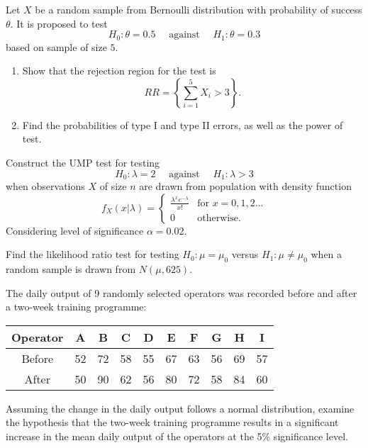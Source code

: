 \begin{mdframed}
    \begin{Exercise}
        Let $X$ be a random sample from Bernoulli distribution 
        with probability of success $\theta$. It is proposed to test
        \[
            H_0 : \theta = 0.5 \quad \text{ against } \quad H_1 : \theta = 0.3
        \]
        based on sample of size $5$.
        \begin{enumerate}
            \item Show that the rejection region for the test is 
            \[
                RR = \left\{ \sum_{i=1}^{5} X_i > 3 \right\}.
            \]
            \item Find the probabilities of type I and type II errors, as well as the power of test.
        \end{enumerate}
    \end{Exercise}

    \begin{Exercise}
        Construct the UMP test for testing 
        \[
            H_0 : \lambda = 2 \quad \text{ against } \quad H_1 : \lambda > 3
        \]
        when observations $X$ of size $n$ are drawn from population with density function
        \[
            f_X(x|\lambda) = \begin{cases}
                \displaystyle \frac{\lambda^x e^{-\lambda}}{x!} & \text{for } x = 0,1,2\ldots \\
                0 & \text{otherwise}.
            \end{cases}
        \]
        Considering level of significance $\alpha = 0.02$.
    \end{Exercise}

    \begin{Exercise}
        Find the likelihood ratio test for testing $H_0:\mu = \mu_0$ versus 
        $H_1:\mu \neq \mu_0$ when a random sample is drawn from 
        $N(\mu, 625)$.
    \end{Exercise}

    \begin{Exercise}
        The daily output of 9 randomly selected operators was recorded before and after a two-week 
        training programme:

        \begin{center}
            \begin{tabular}{c|ccccccccc}
                Operator & A & B & C & D & E & F & G & H & I\\
                \hline
                Before & 52 & 72 & 58 & 55 & 67 & 63 & 56 & 69 & 57\\
                After & 50 & 90 & 62 & 56 & 80 & 72 & 58 & 84 & 60\\
            \end{tabular}
        \end{center}

        Assuming the change in the daily output follows a normal distribution, examine the 
        hypothesis that the two-week training programme results in a significant increase in the 
        mean daily output of the operators at the 5\% significance level.
    \end{Exercise}
\end{mdframed}